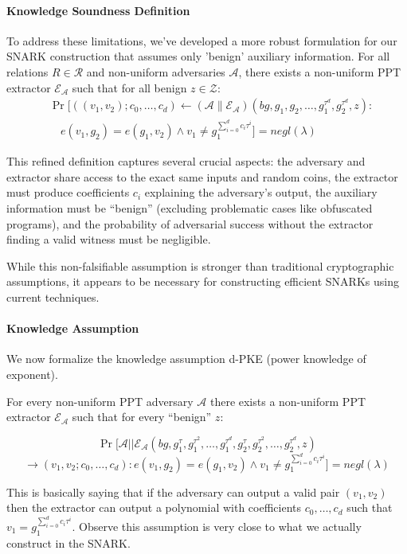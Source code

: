 \paragraph{Knowledge Soundness Definition}

To address these limitations, we've developed a more robust formulation for our SNARK construction that assumes only 'benign' auxiliary information. For all relations $R \in \mathcal{R}$ and non-uniform adversaries $\mathcal{A}$, there exists a non-uniform PPT extractor $\mathcal{E}_\mathcal{A}$ such that for all benign $z \in \mathcal{Z}$:
\[ \begin{aligned}
&\Pr[((v_1, v_2); c_0, \dots, c_d) \gets (\mathcal{A} \| \mathcal{E}_\mathcal{A})(bg, g_1, g_2, \dots, g_1^{\tau^d}, g_2^{\tau^d}, z) : \\
&\quad e(v_1, g_2) = e(g_1, v_2) \land v_1 \neq g_1^{\sum_{i=0}^d c_i \tau^i}] = negl(\lambda)
\end{aligned} \]

This refined definition captures several crucial aspects: the adversary and extractor share access to the exact same inputs and random coins, the extractor must produce coefficients $c_i$ explaining the adversary's output, the auxiliary information must be ``benign'' (excluding problematic cases like obfuscated programs), and the probability of adversarial success without the extractor finding a valid witness must be negligible.

While this non-falsifiable assumption is stronger than traditional cryptographic assumptions, it appears to be necessary for constructing efficient SNARKs using current techniques.

\paragraph{Knowledge Assumption}

We now formalize the knowledge assumption d-PKE (power knowledge of exponent).

For every non-uniform PPT adversary $\mathcal{A}$ there exists a non-uniform PPT extractor $\mathcal{E}_\mathcal{A}$ such that for every ``benign'' $z$:

$$\Pr [\mathcal{A} || \mathcal{E}_\mathcal{A} (bg, g_1^\tau, g_1^{\tau^2}, \dots, g_1^{\tau^d}, g_2^\tau, g_2^{\tau^2}, \dots, g_2^{\tau^d}, z)$$
$$\rightarrow (v_1, v_2; c_0, \dots, c_d) : e(v_1, g_2) = e(g_1, v_2) \land v_1 \neq g_1^{\sum_{i=0}^d c_i \tau^i}] = negl(\lambda)$$

This is basically saying that if the adversary can output a valid pair $(v_1, v_2)$ then the extractor can output a polynomial with coefficients $c_0, \dots, c_d$ such that $v_1 = g_1^{\sum_{i=0}^d c_i \tau^i}$. Observe this assumption is very close to what we actually construct in the SNARK.

